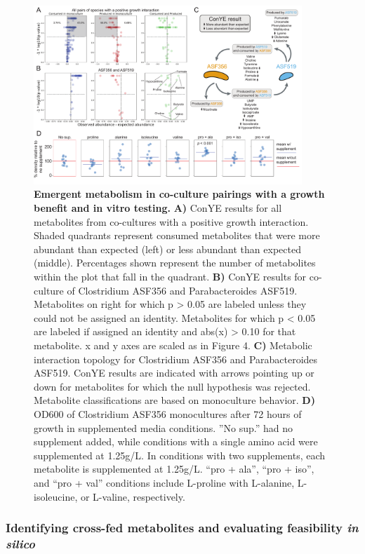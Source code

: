 \documentclass[11pt,twocolumn,notitlepage,openany,twoside]{book}
\begin{document}
\begin{refsection}
\begin{figure}[tb!]
\centering
\includegraphics[width=0.9\textwidth]{ch2_fig6}
\caption[Emergent metabolism in co-culture pairings with a growth benefit and in vitro testing.]{\textbf{Emergent metabolism in co-culture pairings with a growth benefit and in vitro testing.} \textbf{A)} ConYE results for all metabolites from co-cultures with a positive growth interaction. Shaded quadrants represent consumed metabolites that were more abundant than expected (left) or less abundant than expected (middle). Percentages shown represent the number of metabolites within the plot that fall in the quadrant. \textbf{B)} ConYE results for co-culture of Clostridium ASF356 and Parabacteroides ASF519. Metabolites on right for which p > 0.05 are labeled unless they could not be assigned an identity. Metabolites for which p < 0.05 are labeled if assigned an identity and abs(x) > 0.10 for that metabolite. x and y axes are scaled as in Figure 4. \textbf{C)} Metabolic interaction topology for Clostridium ASF356 and Parabacteroides ASF519. ConYE results are indicated with arrows pointing up or down for metabolites for which the null hypothesis was rejected. Metabolite classifications are based on monoculture behavior. \textbf{D)} OD600 of Clostridium ASF356 monocultures after 72 hours of growth in supplemented media conditions. ”No sup.” had no supplement added, while conditions with a single amino acid were supplemented at 1.25g/L. In conditions with two supplements, each metabolite is supplemented at 1.25g/L. “pro + ala”, “pro + iso”, and “pro + val” conditions include L-proline with L-alanine, L-isoleucine, or L-valine, respectively.}
\end{figure}

\subsubsection{Identifying cross-fed metabolites and evaluating feasibility \textit{in silico}}


\end{refsection}
\end{document}
